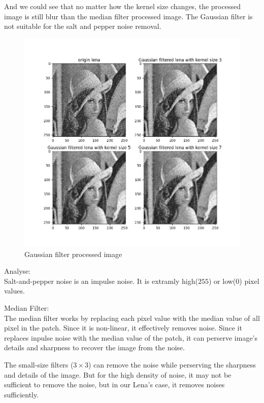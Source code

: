 And we could see that no matter how the kernel size changes, the processed image is still blur than the median filter processed image. The Gaussian filter is not suitable for the salt and pepper noise removal.

\begin{figure}[htbp]
    \centering
	\includegraphics[width=\textwidth]{../images/p3/p3b.png}
    \caption{Gaussian filter processed image}
\label{fig:p3b}
\end{figure}

Analyse:\\
Salt-and-pepper noise is an impulse noise. It is extramly high($255$) or low($0$) pixel values.

Median Filter:\\
The median filter works by replacing each pixel value with the median value of all pixel in the patch. Since it is non-linear, it effectively removes noise. Since it replaces inpulse noise with the median value of the patch, it can perserve image's details and sharpness to recover the image from the noise.

The small-size filters ($3\times 3$) can remove the noise while perserving the sharpness and details of the image. But for the high density of noise, it may not be sufficient to remove the noise, but in our Lena's case, it removes noises sufficiently.

